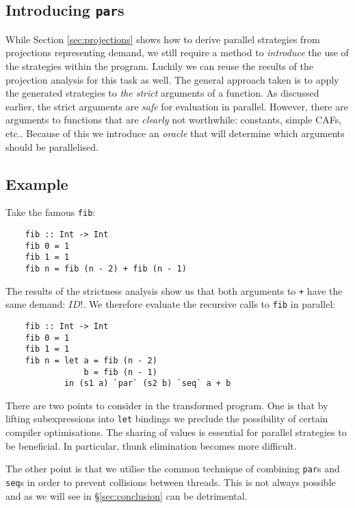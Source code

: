 \subsection{Introducing \texttt{par}s}
\label{sec:introPar}

While Section \ref{sec:projections} shows how to derive parallel strategies
from projections representing demand, we still require a method to
\emph{introduce} the use of the strategies within the program.  Luckily we can
reuse the results of the projection analysis for this task as well.  The
general approach taken is to apply the generated strategies to \emph{the
strict} arguments of a function. As discussed earlier, the strict arguments are
\emph{safe} for evaluation in parallel. However, there are arguments to
functions that are \emph{clearly} not worthwhile: constants, simple CAFs, etc..
Because of this we introduce an \emph{oracle} that will determine which
arguments should be parallelised.

\subsection*{Example}

Take the famous \verb-fib-:

\begin{verbatim}
    fib :: Int -> Int
    fib 0 = 1
    fib 1 = 1
    fib n = fib (n - 2) + fib (n - 1)
\end{verbatim}

The results of the strictness analysis show us that both arguments to \verb-+-
have the same demand: $ID!$. We therefore evaluate the recursive calls to
\verb-fib- in parallel:

\begin{verbatim}
    fib :: Int -> Int
    fib 0 = 1
    fib 1 = 1
    fib n = let a = fib (n - 2)
                b = fib (n - 1)
            in (s1 a) `par` (s2 b) `seq` a + b
\end{verbatim}

There are two points to consider in the transformed program. One is that by
lifting subexpressions into \verb-let- bindings we preclude the possibility of
certain compiler optimisations. The sharing of values is essential for parallel
strategies to be beneficial.  In particular, thunk elimination becomes more
difficult.

The other point is that we utilise the common technique of combining
\verb-par-s and \verb-seq-s in order to prevent collisions between threads.
This is not always possible and as we will see in \S \ref{sec:conclusion} can
be detrimental.

